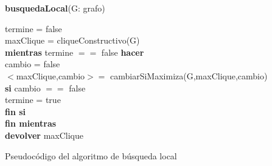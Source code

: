 \vspace{2em}
\incmargin{1em}
\linesnumbered
{}
\footnotesize 
\textbf{busquedaLocal}(G: grafo) \\
\begin{algorithm}[H]
	\BlankLine
	termine = false\\

	maxClique = cliqueConstructivo(G)\\
	
	\textbf{mientras} termine $==$ false \textbf{hacer}\\
		
		\tab cambio = false\\

		\tab $<$maxClique,cambio$> =$ cambiarSiMaximiza(G,maxClique,cambio)\\
		
		\tab \textbf{si} cambio $==$ false\\
			\tab \tab termine = true\\
		\tab \textbf{fin si}\\
	\textbf{fin mientras}\\

	\textbf{devolver} maxClique

\caption{Pseudocódigo del algoritmo de búsqueda local}
\end{algorithm}

\vspace{3em}


